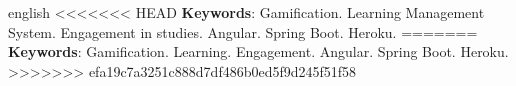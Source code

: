 \begin{resumo}[Abstract]
\begin{otherlanguage*}{english}
   \vspace{\onelineskip}
   \noindent 
<<<<<<< HEAD
   \textbf{Keywords}: Gamification. Learning Management System. Engagement in studies. Angular. Spring Boot. Heroku.
=======
   \textbf{Keywords}: Gamification. Learning. Engagement. Angular. Spring Boot. Heroku.
>>>>>>> efa19c7a3251c888d7df486b0ed5f9d245f51f58
 \end{otherlanguage*}
\end{resumo}